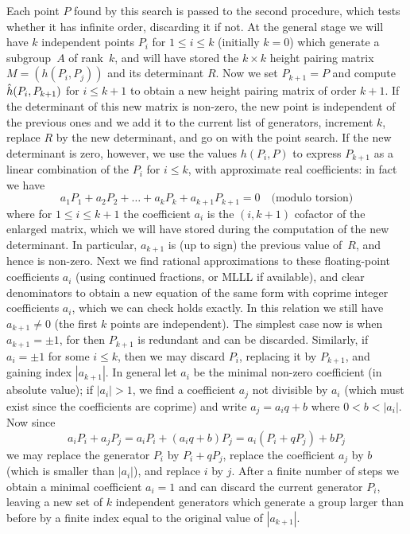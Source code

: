 Each point $P$ found by this search is passed to the second procedure,
which tests whether it has infinite order, discarding it if not.  At
the general stage we will have $k$ independent points $P_i$ for $1\le
i\le k$ (initially $k=0$) which generate a subgroup~$A$ of rank~$k$,
and will have stored the $k\times k$ height pairing matrix
$M=(h(P_i,P_j))$ and its determinant $R$.  Now we set $P_{k+1}=P$ and
compute $\hat{h}(P_i,P_{k+1})$ for $i\le k+1$ to obtain a new height
pairing matrix of order $k+1$.  If the determinant of this new matrix
is non-zero, the new point is independent of the previous ones and we
add it to the current list of generators, increment $k$, replace $R$
by the new determinant, and go on with the point search.  If the new
determinant is zero, however, we use the values $h(P_i,P)$ to express
$P_{k+1}$ as a linear combination of the $P_i$ for $i\le k$, with
approximate real coefficients: in fact we have
$$
   a_1P_1 + a_2P_2 + \ldots + a_kP_k + a_{k+1}P_{k+1} = 0 
                                         \quad\text{(modulo torsion)}
$$ 
where for $1\le i\le k+1$ the coefficient $a_i$ is the $(i,k+1)$
cofactor of the enlarged matrix, which we will have stored during the
computation of the new determinant.  In particular, $a_{k+1}$ is (up
to sign) the previous value of~$R$, and hence is non-zero.  
%
Next we find rational approximations to these floating-point
coefficients $a_i$ (using continued fractions, or MLLL if available),
%
and clear denominators to obtain a new equation of the same form with
coprime integer coefficients $a_i$, which we can check holds exactly.
In this relation we still have $a_{k+1}\not=0$ (the first $k$ points
are independent).  The simplest case now is when $a_{k+1}=\pm1$, for
then $P_{k+1}$ is redundant and can be discarded.  Similarly, if
$a_i=\pm1$ for some $i\le k$, then we may discard $P_i$, replacing it
by $P_{k+1}$, and gaining index $|a_{k+1}|$.  In general let $a_i$ be
the minimal non-zero coefficient (in absolute value); if $|a_i|>1$, we
find a coefficient $a_j$ not divisible by $a_i$ (which must exist
since the coefficients are coprime) and write $a_j=a_iq+b$ where
$0<b<|a_i|$.  Now since
$$
  a_iP_i+a_jP_j = a_iP_i + (a_iq+b)P_j = a_i(P_i+qP_j) + bP_j 
$$ 
we may replace the generator $P_i$ by $P_i+qP_j$, replace the
coefficient $a_j$ by $b$ (which is smaller than $|a_i|$), and replace
$i$ by $j$.  After a finite number of steps we obtain a minimal
coefficient $a_i=1$ and can discard the current generator $P_i$,
leaving a new set of $k$ independent generators which generate a group
larger than before by a finite index equal to the original value of
$|a_{k+1}|$.

